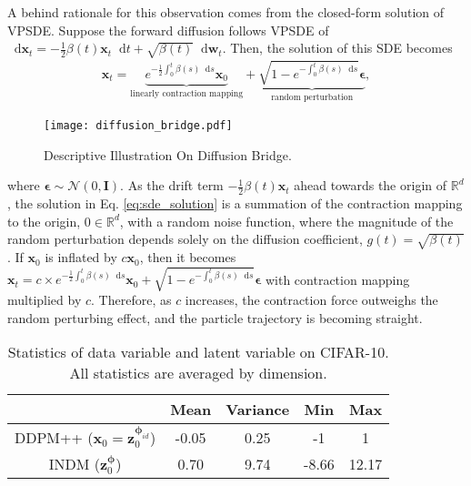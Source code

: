 \documentclass{article}
\theoremstyle{definition}
\theoremstyle{remark}
\newcommand*\diff{\mathop{}\!\mathrm{d}}
\begin{document}
	A behind rationale for this observation comes from the closed-form solution of VPSDE. Suppose the forward diffusion follows VPSDE of $\diff\mathbf{x}_{t}=-\frac{1}{2}\beta(t)\mathbf{x}_{t}\diff t+\sqrt{\beta(t)}\diff\mathbf{w}_{t}$. Then, the solution of this SDE becomes
	\begin{align}\label{eq:sde_solution}
	\mathbf{x}_{t}=\underbrace{e^{-\frac{1}{2}\int_{0}^{t}\beta(s)\diff s}\mathbf{x}_{0}}_{\text{linearly contraction mapping}}+\underbrace{\sqrt{1-e^{-\int_{0}^{t}\beta(s)\diff s}}\bm{\epsilon}}_{\text{random perturbation}},
	\end{align}
	\begin{wrapfigure}{r}{0.6\textwidth}
		\vskip -0.2in
		\centering
		\texttt{[image: diffusion\_bridge.pdf]}
		\vskip -0.05in
		\caption{Descriptive Illustration On Diffusion Bridge.}
		\label{fig:diffusion_bridge}
		\vskip -0.2in
	\end{wrapfigure}
	where $\bm{\epsilon}\sim\mathcal{N}(0,\mathbf{I})$. As the drift term $-\frac{1}{2}\beta(t)\mathbf{x}_{t}$ ahead towards the origin of $\mathbb{R}^{d}$, the solution in Eq. \eqref{eq:sde_solution} is a summation of the contraction mapping to the origin, $0\in\mathbb{R}^{d}$, with a random noise function, where the magnitude of the random perturbation depends solely on the diffusion coefficient, $g(t)=\sqrt{\beta(t)}$. If $\mathbf{x}_{0}$ is inflated by $c\mathbf{x}_{0}$, then it becomes $\mathbf{x}_{t}=c\times e^{-\frac{1}{2}\int_{0}^{t}\beta(s)\diff s}\mathbf{x}_{0}+\sqrt{1-e^{-\int_{0}^{t}\beta(s)\diff s}}\bm{\epsilon}$ with contraction mapping multiplied by $c$. Therefore, as $c$ increases, the contraction force outweighs the random perturbing effect, and the particle trajectory is becoming straight. 
	
	\begin{table}[t]
		\caption{Statistics of data variable and latent variable on CIFAR-10. All statistics are averaged by dimension.}
		\label{tab:statistics}
		\centering
		\tiny
		\begin{tabular}{ccccc}
			\toprule
			& Mean & Variance & Min & Max \\\midrule
			DDPM++ ($\mathbf{x}_{0}=\mathbf{z}_{0}^{\bm{\phi}_{id}}$) & -0.05 & 0.25 & -1 & 1 \\
			INDM ($\mathbf{z}_{0}^{\bm{\phi}}$) & 0.70 & 9.74 & -8.66 & 12.17 \\
			\bottomrule
		\end{tabular}
	\end{table}
	
\end{document}
